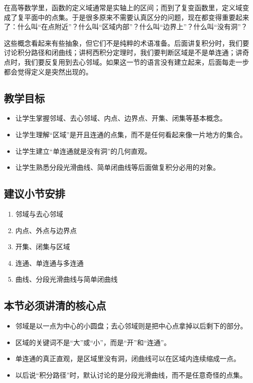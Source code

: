 \begin{wulibj}[本节要解决的问题]
在高等数学里，函数的定义域通常是实轴上的区间；而到了复变函数里，定义域变成了复平面中的点集。于是很多原来不需要认真区分的问题，现在都变得重要起来了：什么叫``在点附近''？什么叫``区域内部''？什么叫``边界上''？什么叫``没有洞''？

这些概念看起来有些抽象，但它们不是纯粹的术语准备。后面讲复积分时，我们要讨论积分路径和闭曲线；讲柯西积分定理时，我们要判断区域是不是单连通；讲奇点时，我们要反复用到去心邻域。如果这一节的语言没有建立起来，后面每走一步都会觉得定义是突然出现的。
\end{wulibj}

\subsection*{教学目标}
\begin{itemize}
    \item 让学生掌握邻域、去心邻域、内点、边界点、开集、闭集等基本概念。
    \item 让学生理解``区域''是开且连通的点集，而不是任何看起来像一片地方的集合。
    \item 让学生建立``单连通就是没有洞''的几何直观。
    \item 让学生熟悉分段光滑曲线、简单闭曲线等后面做复积分必用的对象。
\end{itemize}

\subsection*{建议小节安排}
\begin{enumerate}
    \item 邻域与去心邻域
    \item 内点、外点与边界点
    \item 开集、闭集与区域
    \item 连通、单连通与多连通
    \item 曲线、分段光滑曲线与简单闭曲线
\end{enumerate}

\subsection*{本节必须讲清的核心点}
\begin{itemize}
    \item 邻域是以一点为中心的小圆盘；去心邻域则是把中心点拿掉以后剩下的部分。
    \item 区域的关键词不是``大''或``小''，而是``开''和``连通''。
    \item 单连通的真正直观，是区域里没有洞，闭曲线可以在区域内连续缩成一点。
    \item 以后说``积分路径''时，默认讨论的是分段光滑曲线，而不是任意奇怪的点集。
\end{itemize}

